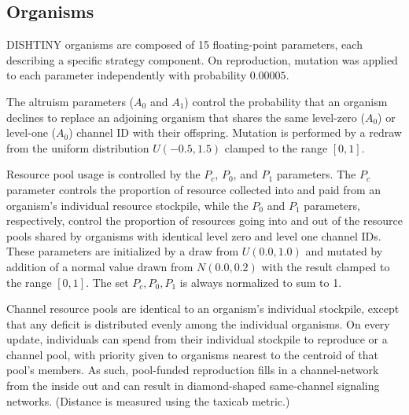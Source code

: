 \subsection{Organisms}

DISHTINY organisms are composed of 15 floating-point parameters,
each describing a specific strategy component.
On reproduction, mutation was applied to each parameter independently with probability $0.00005$.

The altruism parameters ($A_0$ and $A_1$) control the probability that an organism declines to replace an adjoining organism that shares the same level-zero ($A_0$) or level-one ($A_0$) channel ID with their offspring.
Mutation is performed by a redraw from the uniform distribution $U(-0.5,1.5)$ clamped to the range $[0,1]$.

Resource pool usage is controlled by the $P_{c}$, $P_0$, and $P_1$ parameters.
The $P_{c}$ parameter controls the proportion of resource collected into and paid from an organism's individual resource stockpile, while the $P_0$ and $P_1$ parameters, respectively, control the proportion of resources going into and out of the resource pools shared by organisms with identical level zero and level one channel IDs.
These parameters are initialized by a draw from $U(0.0, 1.0)$ and mutated by addition of a normal value drawn from $N(0.0,0.2)$ with the result clamped to the range $[0,1]$.
The set $P_{c}, P_0, P_1$ is always normalized to sum to 1.

Channel resource pools are identical to an organism's individual stockpile, except that any deficit is distributed evenly among the individual organisms.
On every update, individuals can spend from their individual stockpile to reproduce
or a channel pool, with priority given to organisms nearest to the centroid of that pool's members.
As such, pool-funded reproduction fills in a channel-network from the inside out and can result in diamond-shaped same-channel signaling networks.
(Distance is measured using the taxicab metric.)

